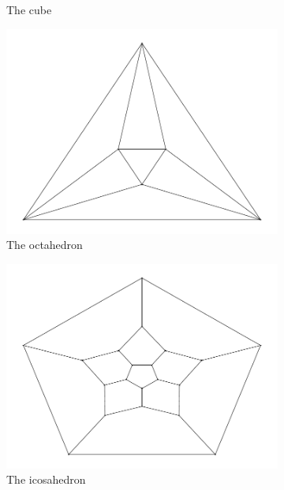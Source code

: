 \documentclass[12pt]{article}
\begin{document}
\begin{figure}[H]
\begin{subfigure}[b]{0.3\textwidth}
          \caption{The cube}
      \end{subfigure}
      \hfill
      \begin{subfigure}[b]{0.3\textwidth}
          \centering 
          \includegraphics[width = \textwidth]{../output/Q1-platonic-8.pdf}
          \caption{The octahedron}
      \end{subfigure}
      \hfill
      \begin{subfigure}[b]{0.3\textwidth}
          \centering 
          \includegraphics[width = \textwidth]{../output/Q1-platonic-12.pdf}
          \caption{The icosahedron}
      \end{subfigure}
      \hfill
      \begin{subfigure}[b]{0.3\textwidth}

\end{subfigure}
\end{figure}
\end{document}
